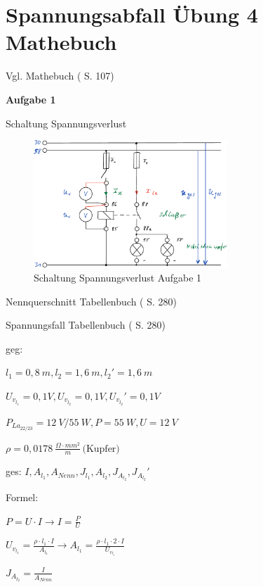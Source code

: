 \section{Spannungsabfall Übung 4
Mathebuch}\label{spannungsabfall-uebung-4-mathebuch}

Vgl. Mathebuch (\textcite{elbl:2016:technMa} S. 107)

\textbf{Aufgabe 1}

Schaltung Spannungsverlust

\begin{figure}[!ht]%
\centering
\includegraphics[width=0.65\textwidth]{images/Skizze/13_Spannungsverlust_Skizze.pdf}
\caption{Schaltung Spannungsverlust Aufgabe 1}
\end{figure}

Nennquerschnitt Tabellenbuch (\textcite{bell:2021:tabellenbuchKfz} S. 280)

Spannungsfall Tabellenbuch (\textcite{bell:2021:tabellenbuchKfz} S. 280)

geg:

$l_1 = 0,8~m, l_2 = 1,6~m, l_{2}' = 1,6~m$

$U_{v_{l_1}} = 0,1 V, U_{v_{l_2}} = 0,1 V, U_{v_{l_2}}' = 0,1 V$

$P_{La_{22/23}}= 12~V/55~W, P = 55~W, U = 12~V$

$\rho = 0,0178~\frac{\Omega \cdot mm^2}{m} \,\text{(Kupfer)}$

ges:
$I, A_{l_1}, A_{Nenn}, J_{l_1}, A_{l_2}, J_{A_{l_2}}, J_{A_{l_2}}'$

Formel:

$P = U \cdot I \to I = \frac{P}{U}$

$U_{v_{l_1}} = \frac{\rho \cdot l_1 \cdot I}{A_{l_1}} \to A_{l_1} = \frac{\rho \cdot l_1 \cdot 2 \cdot I}{U_{v_{l_1}}}$

$J_{A_{l_2}} = \frac{I}{A_{Nenn}}$

